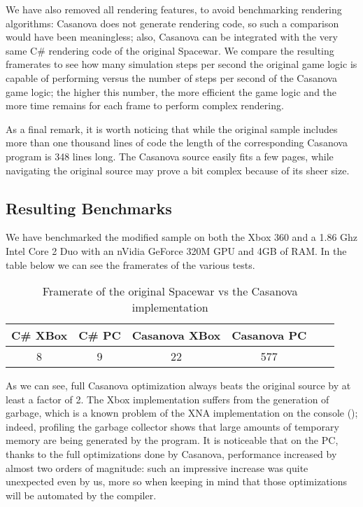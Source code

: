 We have also removed all rendering features, to avoid benchmarking rendering algorithms: Casanova does not generate rendering code, so such a comparison would have been meaningless; also, Casanova can be integrated with the very same C\# rendering code of the original Spacewar. We compare the resulting framerates to see how many simulation steps per second the original game logic is capable of performing versus the number of steps per second of the Casanova game logic; the higher this number, the more efficient the game logic and the more time remains for each frame to perform complex rendering.

As a final remark, it is worth noticing that while the original sample includes more than one thousand lines of code the length of the corresponding Casanova program is 348 lines long. The Casanova source easily fits a few pages, while navigating the original source may prove a bit complex because of its sheer size.

\subsection{Resulting Benchmarks}

We have benchmarked the modified sample on both the Xbox 360 and a 1.86 Ghz Intel Core 2 Duo with an nVidia GeForce 320M GPU and 4GB of RAM. In the table below we can see the framerates of the various tests.

\begin{table}[ht] 
\center
\begin{tabular}{|c|c|c|c|c|c|} 
\hline
C\# XBox & C\# PC & Casanova XBox & Casanova PC \\ 
\hline
8   & 9   & 22  & 577 \\
\hline
\end{tabular} 
\caption{Framerate of the original Spacewar vs the Casanova implementation}
\end{table}

As we can see, full Casanova optimization always beats the original source by at least a factor of 2. The Xbox implementation suffers from the generation of garbage, which is a known problem of the XNA implementation on the console (\cite{XBOX_GC}); indeed, profiling the garbage collector shows that large amounts of temporary memory are being generated by the program. It is noticeable that on the PC, thanks to the full optimizations done by Casanova, performance increased by almost two orders of magnitude: such an impressive increase was quite unexpected even by us, more so when keeping in mind that those optimizations will be automated by the compiler.
